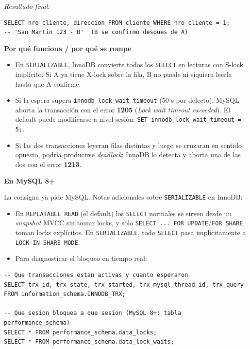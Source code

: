 \documentclass[11pt,a4paper]{article}
\newcommand{\itemcabecera}[1]{\noindent\textbf{#1}\par\medskip}
\newcommand{\bloquePorque}{\itemcabecera{Por qu\'e funciona / por qu\'e se rompe}}
\newcommand{\bloqueMySQL}{\itemcabecera{En MySQL 8+}}
\begin{document}
\textit{Resultado final:}

\begin{lstlisting}
SELECT nro_cliente, direccion FROM cliente WHERE nro_cliente = 1;
-- 'San Martin 123 - B'  (B se confirmo despues de A)
\end{lstlisting}

\bloquePorque

\begin{itemize}
    \item En \texttt{SERIALIZABLE}, InnoDB convierte todos los \texttt{SELECT} en lecturas con S-lock implícito. Si A ya tiene X-lock sobre la fila, B no puede ni siquiera leerla hasta que A confirme.
    \item Si la espera supera \texttt{innodb\_lock\_wait\_timeout} (50 s por defecto), MySQL aborta la transacción con el error \textbf{1205} (\emph{Lock wait timeout exceeded}). El default puede modificarse a nivel sesión: \texttt{SET innodb\_lock\_wait\_timeout = 5;}.
    \item Si las dos transacciones leyeran filas distintas y luego se cruzaran en sentido opuesto, podría producirse \emph{deadlock}; InnoDB lo detecta y aborta una de las dos con el error \textbf{1213}.
\end{itemize}

\bloqueMySQL

La consigna ya pide MySQL. Notas adicionales sobre \texttt{SERIALIZABLE} en InnoDB:

\begin{itemize}
    \item En \texttt{REPEATABLE READ} (el default) los \texttt{SELECT} normales se sirven desde un \emph{snapshot} MVCC sin tomar locks, y solo \texttt{SELECT ... FOR UPDATE}/\texttt{FOR SHARE} toman locks explícitos. En \texttt{SERIALIZABLE}, todo \texttt{SELECT} pasa implícitamente a \texttt{LOCK IN SHARE MODE}.
    \item Para diagnosticar el bloqueo en tiempo real:
\end{itemize}

\begin{lstlisting}
-- Que transacciones estan activas y cuanto esperaron
SELECT trx_id, trx_state, trx_started, trx_mysql_thread_id, trx_query
FROM information_schema.INNODB_TRX;

-- Que sesion bloquea a que sesion (MySQL 8+: tabla performance_schema)
SELECT * FROM performance_schema.data_locks;
SELECT * FROM performance_schema.data_lock_waits;
\end{lstlisting}
\end{document}
